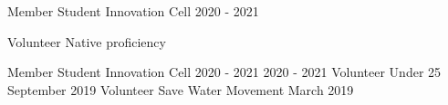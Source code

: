 
\begin{cvskills}

  \cvskill
    {Member} %
    {Student Innovation Cell {2020 - 2021}} %

  \cvskill
    {Volunteer} %
    {Native proficiency} %
    
\end{cvskills}





\begin{cvhonors}

%   
  \cvhonor
    {Member} %
    {Student Innovation Cell {2020 - 2021} } %
    {2020 - 2021} %
    {} %
  \cvhonor
    {Volunteer} %
    {Under 25} %
    {September 2019} %
    {} %
  \cvhonor
    {Volunteer} %
    {Save Water Movement} %
    {March 2019} %
    {} %

\end{cvhonors}